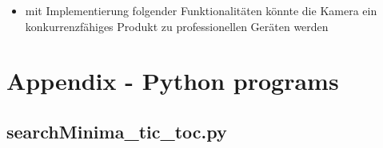 \documentclass[12pt, a4paper]{report}
\begin{document}
             \begin{itemize}
    \item mit Implementierung folgender Funktionalitäten könnte die Kamera ein konkurrenzfähiges Produkt zu professionellen Geräten werden
    \end{itemize}
    
    \glsaddall
    \printglossaries

\printbibliography
        
    \listoffigures
    \bigskip
      
     \chapter*{Appendix - Python programs}  
     \section*{searchMinima\_tic\_toc.py}  
    
    
    
\end{document}
